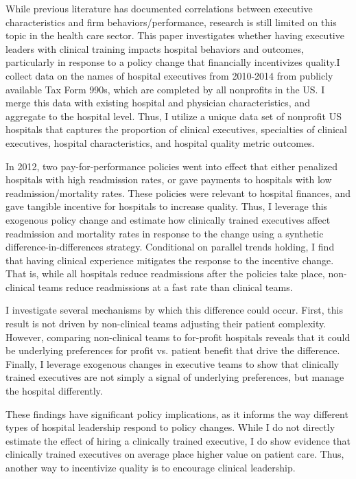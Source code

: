\documentclass[12pt]{article}
\begin{document}
    While previous literature has documented correlations between executive characteristics and firm behaviors/performance, research is still limited on this topic in the health care sector. This paper investigates whether having executive leaders with clinical training impacts hospital behaviors and outcomes, particularly in response to a policy change that financially incentivizes quality.I collect data on the names of hospital executives from 2010-2014 from publicly available Tax Form 990s, which are completed by all nonprofits in the US. I merge this data with existing hospital and physician characteristics, and aggregate to the hospital level. Thus, I utilize a unique data set of nonprofit US hospitals that captures the proportion of clinical executives, specialties of clinical executives, hospital characteristics, and hospital quality metric outcomes. 

    In 2012, two pay-for-performance policies went into effect that either penalized hospitals with high readmission rates, or gave payments to hospitals with low readmission/mortality rates. These policies were relevant to hospital finances, and gave tangible incentive for hospitals to increase quality. Thus, I leverage this exogenous policy change and estimate how clinically trained executives affect readmission and mortality rates in response to the change using a synthetic difference-in-differences strategy. Conditional on parallel trends holding, I find that having clinical experience mitigates the response to the incentive change. That is, while all hospitals reduce readmissions after the policies take place, non-clinical teams reduce readmissions at a fast rate than clinical teams. 
    
    I investigate several mechanisms by which this difference could occur. First, this result is not driven by non-clinical teams adjusting their patient complexity. However, comparing non-clinical teams to for-profit hospitals reveals that it could be underlying preferences for profit vs. patient benefit that drive the difference. Finally, I leverage exogenous changes in executive teams to show that clinically trained executives are not simply a signal of underlying preferences, but manage the hospital differently. 

    These findings have significant policy implications, as it informs the way different types of hospital leadership respond to policy changes. While I do not directly estimate the effect of hiring a clinically trained executive, I do show evidence that clinically trained executives on average place higher value on patient care. Thus, another way to incentivize quality is to encourage clinical leadership. 
\end{document}

